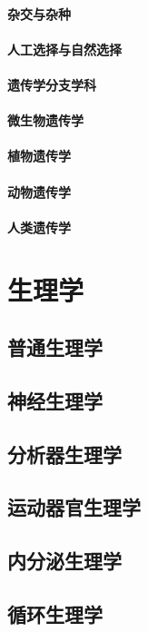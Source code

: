 \documentclass[UTF8]{../NatureUniverse}
\begin{document}
\subsubsection{杂交与杂种}
\subsubsection{人工选择与自然选择}
\subsubsection{遗传学分支学科}
\subsubsection{微生物遗传学}
\subsubsection{植物遗传学}
\subsubsection{动物遗传学}
\subsubsection{人类遗传学}







\chapter{生理学}
\section{普通生理学}
\section{神经生理学}
\section{分析器生理学}
\section{运动器官生理学}
\section{内分泌生理学}
\section{循环生理学}
\end{document}
